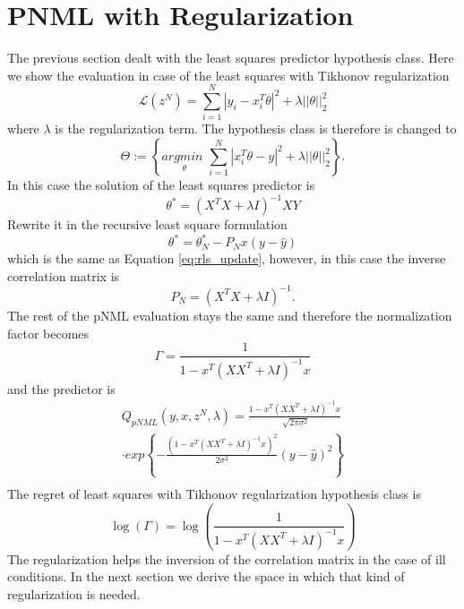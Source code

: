 \documentclass[conference,letterpaper]{IEEEtran}
\begin{document}
\section{PNML with Regularization} \label{sec:pNMLwithReg}
The previous section dealt with the least squares predictor hypothesis class. Here we show the evaluation in case of the least squares with Tikhonov regularization 
\begin{equation}
\mathcal{L}(z^N)= \sum_{i=1}^{N}|y_i-x_i^T \theta|^2 + \lambda ||\theta||_2^2
\end{equation}
where $\lambda$ is the regularization term.
The hypothesis class is therefore is changed to
\begin{equation} \label{eq:ls_reg_hypotheses_class}
\Theta := \left\{ \underset{\theta}{\textit{argmin }} \sum_{i=1}^{N} | x^T_i \theta - y |^2 + \lambda ||\theta||_2^2 \right\}.
\end{equation}
In this case the solution of the least squares predictor is
\begin{equation}
\theta ^* = (X^T X+ \lambda I)^{-1} X Y
\end{equation}
Rewrite it in the recursive least square formulation 
\begin{equation}
\theta ^*=\theta^*_{N} - P_N x (y - \hat{y})
\end{equation}
which is the same as Equation \ref{eq:rls_update}, however, in this case the inverse correlation matrix is 
\begin{equation}
P_N= (X^T X+ \lambda I)^{-1}.    
\end{equation}
The rest of the pNML evaluation stays the same and therefore the normalization factor becomes
\begin{equation}
\Gamma =\frac{1}{1 - x^T (XX^T+ \lambda I)^{-1} x } 
\end{equation}
and the predictor is 
\begin{multline} \label{eq:pNML_least_sqaures}
Q_{pNML}(y,x, z^N, \lambda)
=\frac{1 - x^T (XX^T + \lambda I)^{-1} x }{\sqrt[]{2\pi\sigma^2}} \\
\cdot exp\left\{-\frac{(1 - x^T (XX^T + \lambda I)^{-1} x )^2 }{2\sigma^2}\left(y- \hat{y} \right)^2\right\} \\
\end{multline}
The regret of least squares with Tikhonov regularization hypothesis class is
\begin{equation}
\log (\Gamma) = \log \left( \frac{1}{1 - x^T (XX^T + \lambda I)^{-1} x } \right)
\end{equation}
The regularization helps the inversion of the correlation matrix in the case of ill conditions. In the next section we derive the space in which that kind of regularization is needed.
\end{document}
